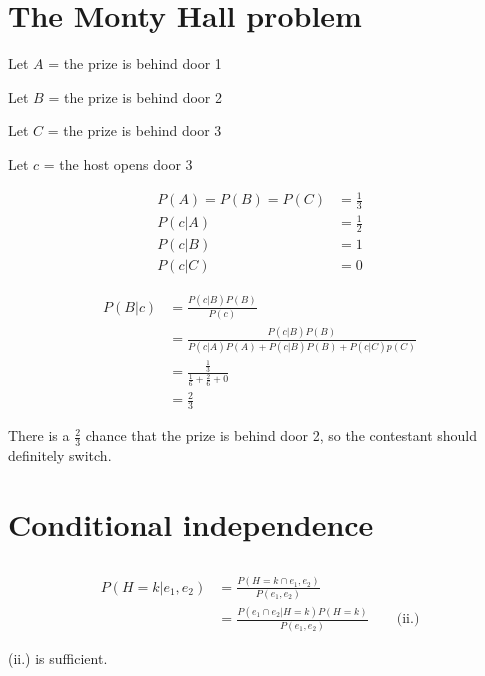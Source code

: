 \documentclass{article}
\begin{document}
\section{The Monty Hall problem}

\begin{list}{}{}
\item Let $A$ = the prize is behind door 1
\item Let $B$ = the prize is behind door 2
\item Let $C$ = the prize is behind door 3
\item Let $c$ = the host opens door 3
\end{list}

\begin{align*}
  P(A) = P(B) = P(C) &= \frac{1}{3} \\
  P(c|A) &= \frac{1}{2} \\
  P(c|B) &= 1 \\
  P(c|C) &= 0
\end{align*}

\begin{align*}
  P(B|c) &= \frac{P(c|B)P(B)}{P(c)} \\
  &= \frac{P(c|B)P(B)}{P(c|A)P(A) + P(c|B)P(B) + P(c|C)p(C)} \\
  &= \frac{\frac{1}{3}}{\frac{1}{6} + \frac{2}{6} + 0} \\
  &= \frac{2}{3}
\end{align*}

There is a $\frac{2}{3}$ chance that the prize is behind door 2, so
the contestant should definitely switch.

\section{Conditional independence}
\subsection{}

\begin{align*}
  P(H=k|e_1,e_2) &= \frac{P(H=k \cap e_1,e_2)}{P(e_1,e_2)} \\
  &= \frac{P(e_1 \cap e_2|H=k)P(H=k)}{P(e_1,e_2)} \qquad \text{(ii.)}
\end{align*}

(ii.) is sufficient.

\subsection{}
\end{document}
